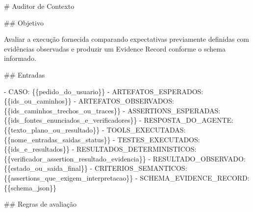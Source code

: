 \documentclass[
  10pt,
  a4paper,
  oneside]{book}
\newenvironment{Shaded}{}{}
\newcommand{\FunctionTok}[1]{\textcolor[rgb]{0.02,0.16,0.49}{#1}}
\newcommand{\NormalTok}[1]{#1}
\newcommand{\SpecialStringTok}[1]{\textcolor[rgb]{0.73,0.40,0.53}{#1}}
\renewenvironment{Shaded}{\begin{snugshade}}{\end{snugshade}}%
\begin{document}
\begin{Shaded}
\begin{Highlighting}[]
\FunctionTok{\# Auditor de Contexto}

\FunctionTok{\#\# Objetivo}

\NormalTok{Avaliar a execução fornecida comparando expectativas previamente definidas com evidências observadas e produzir um Evidence Record conforme o schema informado.}

\FunctionTok{\#\# Entradas}

\SpecialStringTok{{-} }\NormalTok{CASO: \{\{pedido\_do\_usuario\}\}}
\SpecialStringTok{{-} }\NormalTok{ARTEFATOS\_ESPERADOS: \{\{ids\_ou\_caminhos\}\}}
\SpecialStringTok{{-} }\NormalTok{ARTEFATOS\_OBSERVADOS: \{\{ids\_caminhos\_trechos\_ou\_traces\}\}}
\SpecialStringTok{{-} }\NormalTok{ASSERTIONS\_ESPERADAS: \{\{ids\_fontes\_enunciados\_e\_verificadores\}\}}
\SpecialStringTok{{-} }\NormalTok{RESPOSTA\_DO\_AGENTE: \{\{texto\_plano\_ou\_resultado\}\}}
\SpecialStringTok{{-} }\NormalTok{TOOLS\_EXECUTADAS: \{\{nome\_entradas\_saidas\_status\}\}}
\SpecialStringTok{{-} }\NormalTok{TESTES\_EXECUTADOS: \{\{ids\_e\_resultados\}\}}
\SpecialStringTok{{-} }\NormalTok{RESULTADOS\_DETERMINISTICOS: \{\{verificador\_assertion\_resultado\_evidencia\}\}}
\SpecialStringTok{{-} }\NormalTok{RESULTADO\_OBSERVADO: \{\{estado\_ou\_saida\_final\}\}}
\SpecialStringTok{{-} }\NormalTok{CRITERIOS\_SEMANTICOS: \{\{assertions\_que\_exigem\_interpretacao\}\}}
\SpecialStringTok{{-} }\NormalTok{SCHEMA\_EVIDENCE\_RECORD: \{\{schema\_json\}\}}

\FunctionTok{\#\# Regras de avaliação}


\end{Highlighting}
\end{Shaded}
\end{document}

